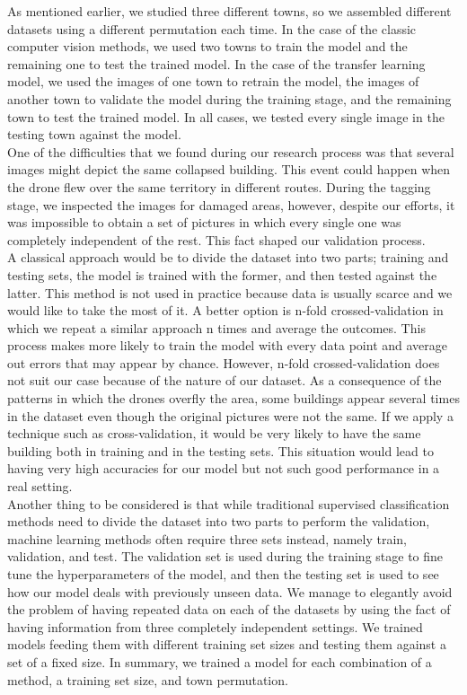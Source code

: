 As mentioned earlier, we studied three different towns, so we assembled different datasets using a different permutation each time. In the case of the classic computer vision methods, we used two towns to train the model and the remaining one to test the trained model. In the case of the transfer learning model, we used the images of one town to retrain the model, the images of another town to validate the model during the training stage, and the remaining town to test the trained model. In all cases, we tested every single image in the testing town against the model.\\

One of the difficulties that we found during our research process was that several images might depict the same collapsed building. 
This event could happen when the drone flew over the same territory in different routes. During the tagging stage, we inspected the images for damaged areas, however, despite our efforts, it was impossible to obtain a set of pictures in which every single one was completely independent of the rest. This fact shaped our validation process.\\

A classical approach would be to divide the dataset into two parts; training and testing sets, the model is trained with the former, and then tested against the latter. This method is not used in practice because data is usually scarce and we would like to take the most of it. A better option is n-fold crossed-validation in which we repeat a similar approach n times and average the outcomes. This process makes more likely to train the model with every data point and average out errors that may appear by chance. However, n-fold crossed-validation does not suit our case because of the nature of our dataset. As a consequence of the patterns in which the drones overfly the area, some buildings appear several times in the dataset even though the original pictures were not the same. If we apply a technique such as cross-validation, it would be very likely to have the same building both in training and in the testing sets. This situation would lead to having very high accuracies for our model but not such good performance in a real setting.\\

Another thing to be considered is that while traditional supervised classification methods need to divide the dataset into two parts to perform the validation, machine learning methods often require three sets instead, namely train, validation, and test. The validation set is used during the training stage to fine tune the hyperparameters of the model, and then the testing set is used to see how our model deals with previously unseen data. We manage to elegantly avoid the problem of having repeated data on each of the datasets by using the fact of having information from three completely independent settings. We trained models feeding them with different training set sizes and testing them against a set of a fixed size. In summary, we trained a model for each combination of a method, a training set size, and town permutation.\\

